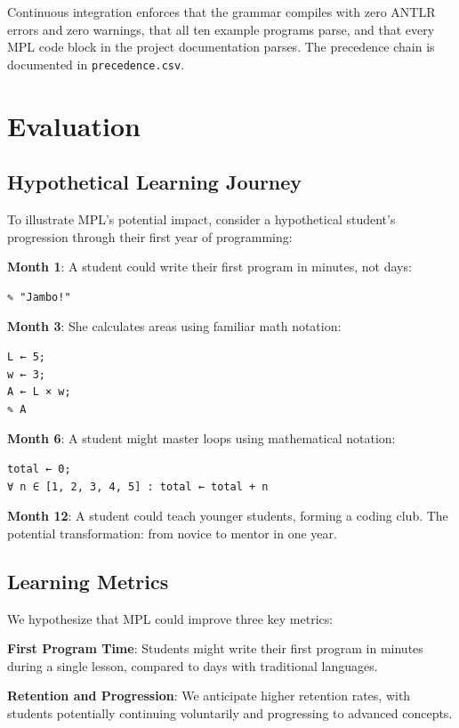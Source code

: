 \documentclass[10pt,conference]{IEEEtran}
\begin{document}
Continuous integration enforces that the grammar compiles with zero ANTLR errors and zero warnings, that all ten example programs parse, and that every MPL code block in the project documentation parses. The precedence chain is documented in \texttt{precedence.csv}.

\section{Evaluation}

\subsection{Hypothetical Learning Journey}

To illustrate MPL's potential impact, consider a hypothetical student's progression through their first year of programming:

\textbf{Month 1}: A student could write their first program in minutes, not days:
\begin{lstlisting}[language=MPL]
✎ "Jambo!"
\end{lstlisting}

\textbf{Month 3}: She calculates areas using familiar math notation:
\begin{lstlisting}[language=MPL]
L ← 5;
w ← 3;
A ← L × w;
✎ A
\end{lstlisting}

\textbf{Month 6}: A student might master loops using mathematical notation:
\begin{lstlisting}[language=MPL]
total ← 0;
∀ n ∈ [1, 2, 3, 4, 5] : total ← total + n
\end{lstlisting}

\textbf{Month 12}: A student could teach younger students, forming a coding club. The potential transformation: from novice to mentor in one year.

\subsection{Learning Metrics}

We hypothesize that MPL could improve three key metrics:

\textbf{First Program Time}: Students might write their first program in minutes during a single lesson, compared to days with traditional languages.

\textbf{Retention and Progression}: We anticipate higher retention rates, with students potentially continuing voluntarily and progressing to advanced concepts.
\end{document}
